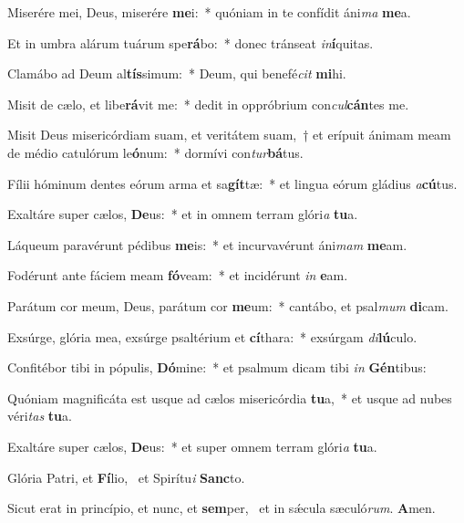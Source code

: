 \item Miserére mei, Deus, miserére \textbf{me}i:~* quóniam in te confídit áni\textit{ma} \textbf{me}a.
\item Et in umbra alárum tuárum spe\textbf{rá}bo:~* donec tránseat \textit{in}\textbf{í}quitas.
\item Clamábo ad Deum al\textbf{tís}simum:~* Deum, qui benefé\textit{cit} \textbf{mi}hi.
\item Misit de cælo, et libe\textbf{rá}vit me:~* dedit in oppróbrium con\textit{cul}\textbf{cán}tes me.
\item Misit Deus misericórdiam suam, et veritátem suam,~† et erípuit ánimam meam de médio catulórum le\textbf{ó}num:~* dormívi con\textit{tur}\textbf{bá}tus.
\item Fílii hóminum dentes eórum arma et sa\textbf{gít}tæ:~* et lingua eórum gládius \textit{a}\textbf{cú}tus.
\item Exaltáre super cælos, \textbf{De}us:~* et in omnem terram glóri\textit{a} \textbf{tu}a.
\item Láqueum paravérunt pédibus \textbf{me}is:~* et incurvavérunt áni\textit{mam} \textbf{me}am.
\item Fodérunt ante fáciem meam \textbf{fó}veam:~* et incidérunt \textit{in} \textbf{e}am.
\item Parátum cor meum, Deus, parátum cor \textbf{me}um:~* cantábo, et psal\textit{mum} \textbf{di}cam.
\item Exsúrge, glória mea, exsúrge psaltérium et \textbf{cí}thara:~* exsúrgam \textit{di}\textbf{lú}culo.
\item Confitébor tibi in pópulis, \textbf{Dó}mine:~* et psalmum dicam tibi \textit{in} \textbf{Gén}tibus:
\item Quóniam magnificáta est usque ad cælos misericórdia \textbf{tu}a,~* et usque ad nubes véri\textit{tas} \textbf{tu}a.
\item Exaltáre super cælos, \textbf{De}us:~* et super omnem terram glóri\textit{a} \textbf{tu}a.
\item Glória Patri, et \textbf{Fí}lio,~\psstar{} et Spirítu\textit{i} \textbf{Sanc}to.
\item Sicut erat in princípio, et nunc, et \textbf{sem}per,~\psstar{} et in sǽcula sæculó\textit{rum}. \textbf{A}men.